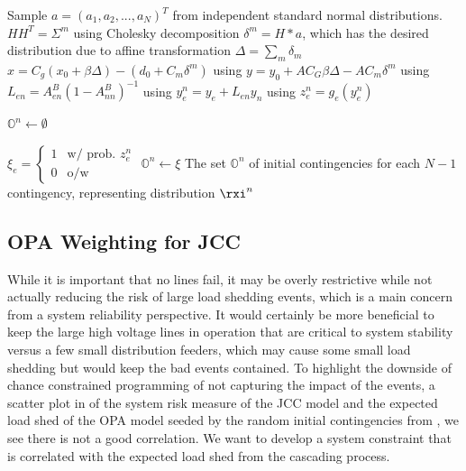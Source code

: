 \begin{algorithm}
\caption[Contingency sampling algorithm for OPA]{Contingency Sampling Algorithm for OPA.  Given a dispatch $(x, \beta)$, random demand $\rd=d_0 + C_m \ri$, sample $\rxi^n$ for $T$ trials for each $N-1$ Contingency }\label{opa_sample_alg}
\begin{algorithmic}
\State Sample $a=(a_1,a_2,...,a_N)^T$ from independent standard normal distributions.
\State $H H^T = \Sigma^m$ using Cholesky decomposition
\State $\delta^m = H * a$, which has the desired distribution due to affine transformation
\State $\Delta = \sum_m \delta_m$
\State $x=C_g(x_0 + \beta \Delta)  -(d_0 + C_m \delta^m)$ using  
\State $y=y_0 + A C_G \beta \Delta - A C_m \delta^m$ using 
\State $L_{e n} = A^B_{en}(1-A^B_{nn})^{-1}$ using 
\State $y_e^n = y_e + L_{e n} y_n$  using 
\State $z_e^n = g_e (y_e^n)$

\State $\mathbb{O}^n \gets \emptyset$

\State $\xi_e = 
\left\{ 
\begin{array}{lr}
  1 & \mbox{w/ prob. } z_e^n \\
  0 & \mbox{o/w }
\end{array}
\right. $ 
\EndFor
\State $\mathbb{O}^n \gets \xi$
\EndFor
\EndFor
\EndFor
\State The set $\mathbb{O}^n$ of initial contingencies for each $N-1$ contingency, representing distribution $\rxi^n$
\EndProcedure
\end{algorithmic}
\end{algorithm}





\subsection{OPA Weighting for JCC}


While it is important that no lines fail, it may be overly restrictive while not actually reducing the risk of large load shedding events, which is a main concern from a system reliability perspective. It would certainly be more beneficial to keep the large high voltage lines in operation that are critical to system stability versus a few small distribution feeders, which may cause some small load shedding but would keep the bad events contained.  To highlight the downside of chance constrained programming of not capturing the impact of the events,  a scatter plot in   of the system risk measure of the JCC model and the expected load shed of the OPA model seeded by the random initial contingencies from , we see there is not a good correlation.  We want to develop a system constraint that is correlated with the expected load shed from the cascading process.

